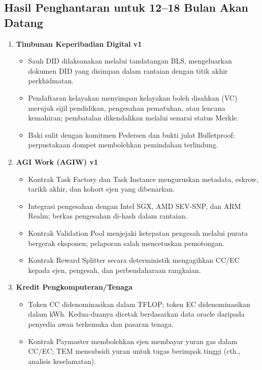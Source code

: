 \documentclass[11pt]{article}
\begin{document}
\subsection{Hasil Penghantaran untuk 12--18 Bulan Akan Datang}
\begin{enumerate}[label=\textbf{D\arabic*.}, leftmargin=*]
  \item \textbf{Timbunan Keperibadian Digital v1}
  \begin{itemize}[noitemsep]
    \item Sauh DID dilaksanakan melalui tandatangan BLS, mengeluarkan dokumen DID yang disimpan dalam rantaian dengan titik akhir perkhidmatan.
    \item Pendaftaran kelayakan menyimpan kelayakan boleh disahkan (VC) merujuk sijil pendidikan, pengesahan pematuhan, atau lencana kemahiran; pembatalan dikendalikan melalui senarai status Merkle.
    \item Baki sulit dengan komitmen Pedersen dan bukti julat Bulletproof; perpustakaan dompet membolehkan pemindahan terlindung.
  \end{itemize}
  \item \textbf{AGI Work (AGIW) v1}
  \begin{itemize}[noitemsep]
    \item Kontrak Task Factory dan Task Instance menguruskan metadata, eskrow, tarikh akhir, dan kohort ejen yang dibenarkan.
    \item Integrasi pengesahan dengan Intel SGX, AMD SEV-SNP, dan ARM Realm; berkas pengesahan di-hash dalam rantaian.
    \item Kontrak Validation Pool menjejaki ketepatan pengesah melalui purata bergerak eksponen; pelaporan salah mencetuskan pemotongan.
    \item Kontrak Reward Splitter secara deterministik mengagihkan CC/EC kepada ejen, pengesah, dan perbendaharaan rangkaian.
  \end{itemize}
  \item \textbf{Kredit Pengkomputeran/Tenaga}
  \begin{itemize}[noitemsep]
    \item Token CC didenominasikan dalam TFLOP; token EC didenominasikan dalam kWh. Kedua-duanya dicetak berdasarkan data oracle daripada penyedia awan terkemuka dan pasaran tenaga.
    \item Kontrak Paymaster membolehkan ejen membayar yuran gas dalam CC/EC; TEM mensubsidi yuran untuk tugas berimpak tinggi (cth., analisis keselamatan).
  \end{itemize}

\end{enumerate}
\end{document}
